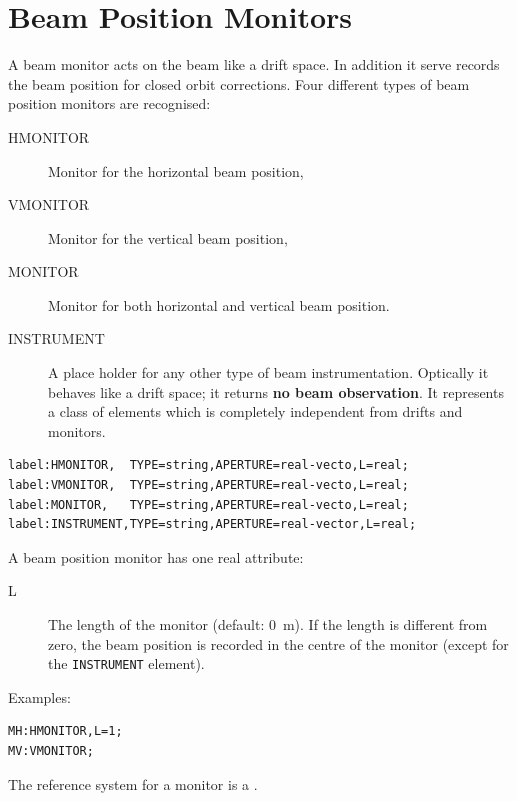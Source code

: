 \section{Beam Position Monitors}
\label{sec:monitors}
A beam monitor acts on the beam like a drift space.
In addition it serve records the beam position for closed orbit
corrections. 
Four different types of beam position monitors are recognised:
\begin{description}
\item[HMONITOR]
  \label{sec:hmonitor}
  Monitor for the horizontal beam position,
\item[VMONITOR]
  \label{sec:vmonitor}
  Monitor for the vertical beam position,
\item[MONITOR]
  \label{sec:monitor}
  Monitor for both horizontal and vertical beam position.
\item[INSTRUMENT]
  \label{sec:instrument}
  A place holder for any other type of beam instrumentation.
  Optically it behaves like a drift space;
  it returns \textbf{no beam observation}.
  It represents a class of elements
  which is completely independent from drifts and monitors.
\end{description}
\begin{verbatim}
label:HMONITOR,  TYPE=string,APERTURE=real-vecto,L=real;
label:VMONITOR,  TYPE=string,APERTURE=real-vecto,L=real;
label:MONITOR,   TYPE=string,APERTURE=real-vecto,L=real;
label:INSTRUMENT,TYPE=string,APERTURE=real-vector,L=real;
\end{verbatim}
A beam position monitor has one real attribute:
\begin{description}
\item[L]
  The length of the monitor (default: 0~m). 
  If the length is different from zero,
  the beam position is recorded in the centre of the monitor
  (except for the \texttt{INSTRUMENT} element).
\end{description}
\noindent Examples:
\begin{verbatim}
MH:HMONITOR,L=1;
MV:VMONITOR;
\end{verbatim}
The reference system for a monitor is a 
.

